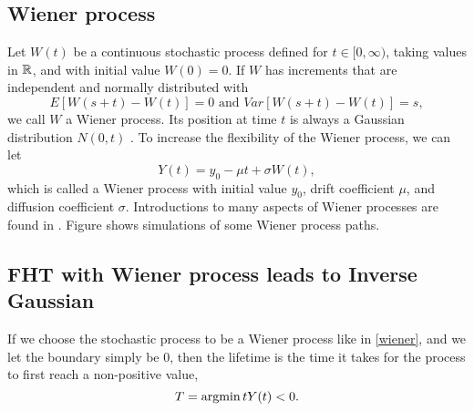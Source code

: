 \subsection{Wiener process}
Let $W(t)$ be a continuous stochastic process defined for $t\in[0,\infty)$, taking values in $\mathbb{R}$, and with initial value $W(0)=0$. If $W$ has increments that are independent and normally distributed with
\begin{equation*}
    E[W(s+t)-W(t)]=0\text{   and   }Var[W(s+t)-W(t)]=s,
\end{equation*}
we call $W$ a Wiener process. Its position at time $t$ is always a Gaussian distribution $N(0, t)$ \citep{ABG}. To increase the flexibility of the Wiener process, we can let
\begin{equation}\label{wiener}
    Y(t)=y_0-\mu t+\sigma W(t),
\end{equation}
which is called a Wiener process with initial value $y_0$, drift coefficient $\mu$, and diffusion coefficient $\sigma$. Introductions to many aspects of Wiener processes are found in \citet{cox1965}. Figure  shows simulations of some Wiener process paths.

\subsection{FHT with Wiener process leads to Inverse Gaussian}
If we choose the stochastic process to be a Wiener process like in \eqref{wiener}, and we let the boundary simply be 0, then the lifetime is the time it takes for the process to first reach a non-positive value,
\begin{equation}
    T=\operatorname*{argmin}{t}Y(t)<0.
\end{equation}



